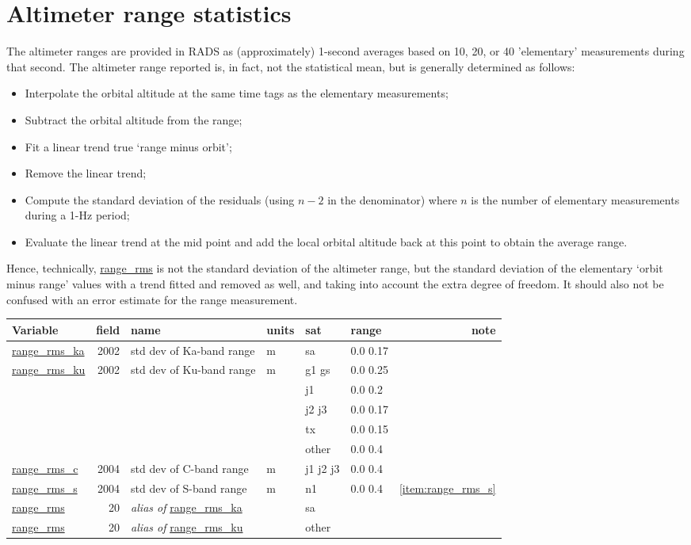 \documentclass[a4paper,11pt,openany,natbib,nomargin]{thesis}
\makeatletter
\newcommand\var[1]{\url{#1}\index{variables!#1@\protect\url{#1}}}
\newcommand\alias[1]{\emph{alias of} \var{#1}}
\newenvironment{vartable}{
\begin{table}[ht]
\small
\begin{tabular}{lrllllr}
\hline
Variable & field & name & units & sat & range & note \\
\hline
}{
\hline
\end{tabular}
\end{table}
}
\makeatother
\begin{document}
\section{Altimeter range statistics}
The altimeter ranges are provided in RADS as (approximately) 1-second averages based on 10, 20, or 40 'elementary' measurements during that second. The altimeter range reported is, in fact, not the statistical mean, but is generally determined as follows:
\begin{itemize}
\item Interpolate the orbital altitude at the same time tags as the elementary measurements;
\item Subtract the orbital altitude from the range;
\item Fit a linear trend true `range minus orbit';
\item Remove the linear trend;
\item Compute the standard deviation of the residuals (using $n-2$ in the denominator) where $n$ is the number of elementary measurements during a 1-Hz period;
\item Evaluate the linear trend at the mid point and add the local orbital altitude back at this point to obtain the average range.
\end{itemize}
Hence, technically, \var{range_rms} is not the standard deviation of the altimeter range, but the standard deviation of the elementary `orbit minus range' values with a trend fitted and removed as well, and taking into account the extra degree of freedom. It should also not be confused with an error estimate for the range measurement.

\begin{vartable}
\var{range_rms_ka} & 2002 & std dev of Ka-band range & m & sa & 0.0 0.17 & \\
\var{range_rms_ku} & 2002 & std dev of Ku-band range & m & g1 gs & 0.0 0.25 & \\
                   &      &                          &   & j1 & 0.0 0.2 & \\
                   &      &                          &   & j2 j3 & 0.0 0.17 & \\
                   &      &                          &   & tx & 0.0 0.15 & \\
                   &      &                          &   & other & 0.0 0.4 & \\
\var{range_rms_c}  & 2004 & std dev of C-band range  & m & j1 j2 j3 & 0.0 0.4 & \\
\var{range_rms_s}  & 2004 & std dev of S-band range  & m & n1 & 0.0 0.4 & \ref{item:range_rms_s} \\
\hline
\var{range_rms}    &   20 & \alias{range_rms_ka} && sa && \\
\var{range_rms}    &   20 & \alias{range_rms_ku} && other && \\
\end{vartable}
\end{document}
